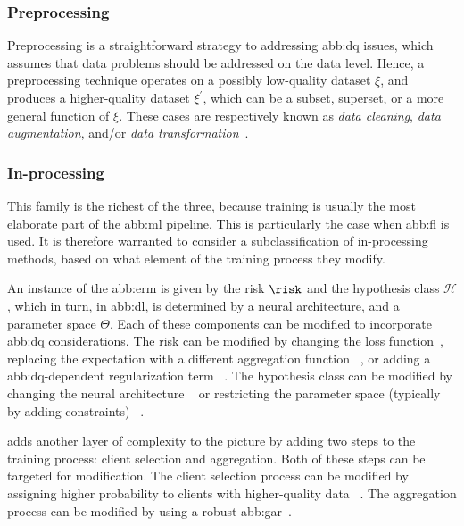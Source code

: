 \subsubsection{Preprocessing}\label{ssub:dq:solution:pre}

Preprocessing is a straightforward strategy to addressing \gls{abb:dq} issues, which assumes that data problems should be addressed on the data level.
Hence, a preprocessing technique operates on
a possibly low-quality dataset \(\xi\),
and produces a higher-quality dataset \(\xi^{\prime}\),
which can be a subset, superset, or a more general function of \(\xi\).
These cases are respectively known as \emph{data cleaning},
\emph{data augmentation}, and/or \emph{data transformation}~\cite{%
	ramirez-gallegoSurveyDataPreprocessing2017,%
	wernerdevargasImbalancedDataPreprocessing2023,%
	youHandlingMissingData2020%
}.

\subsubsection{In-processing}\label{ssub:dq:solution:in}

This family is the richest of the three,
because training is usually the most elaborate part of the \gls{abb:ml} pipeline.
This is particularly the case when \gls{abb:fl} is used.
It is therefore warranted to consider a subclassification
of in-processing methods, based on what element of the training process they modify.

An instance of the \gls{abb:erm} is given by the risk \(\risk\)
and the hypothesis class \(\mathcal{H}\), which in turn,
in \gls{abb:dl}, is determined by a neural architecture,
and a parameter space \(\Theta\).
Each of these components can be modified to incorporate \gls{abb:dq} considerations.
The risk can be modified by
changing the loss function~\cite{zhangGeneralizedCrossEntropy2018},
replacing the expectation with a different aggregation function%
~\cite{linDistributionallyRobustOptimization2022},
or adding a \gls{abb:dq}-dependent regularization term%
~\cite{zhouFederatedLabelNoiseLearning2024}.
The hypothesis class can be modified by changing the neural architecture%
~\cite{goldbergerTrainingDeepNeuralnetworks2022}
or restricting the parameter space (typically by adding constraints)%
~\cite{zafarFairnessConstraintsMechanisms2017}.

 adds another layer of complexity to the picture
by adding two steps to the training process: client selection and aggregation.
Both of these steps can be targeted for modification.
The client selection process can be modified by
assigning higher probability to clients with higher-quality data%
~\cite{taikDataQualityBasedScheduling2021,liSamplelevelDataSelection2021}.
The aggregation process can be modified by
using a robust \gls{abb:gar}~\cite{el-mhamdiStrategyproofnessGeometricMedian2023}.

